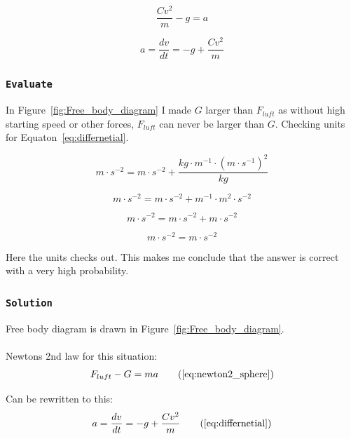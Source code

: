 \documentclass{article}
\let\oldsubsubsection\subsubsection
\renewcommand{\subsubsection}[1]{%
  \oldsubsubsection{\texttt{#1}}%
}
\begin{document}
\begin{equation*}
    \frac{Cv^2}{m} - g = a
\end{equation*}

\begin{equation}
    a = \frac{dv}{dt} = - g + \frac{Cv^2}{m}
    \label{eq:differnetial}
\end{equation}


\clearpage
\subsubsection{Evaluate}
In Figure~\ref{fig:Free_body_diagram} I made \(G\) larger than \(F_{luft}\) as without high starting speed or other forces, \(F_{luft}\) can never be larger than \(G\). Checking units for Equaton~\ref{eq:differnetial}.

\begin{equation*}
    m \cdot s^{-2} = m \cdot s^{-2} + \frac{kg \cdot m^{-1} \cdot (m \cdot s^{-1})^2}{kg}
\end{equation*}

\begin{equation*}
    m \cdot s^{-2} = m \cdot s^{-2} + m^{-1} \cdot m^2 \cdot s^{-2}
\end{equation*}

\begin{equation*}
    m \cdot s^{-2} = m \cdot s^{-2} + m \cdot s^{-2}
\end{equation*}


\begin{equation*}
    m \cdot s^{-2} = m \cdot s^{-2} 
\end{equation*}

Here the units checks out. This makes me conclude that the answer is correct with a very high probability.

\subsubsection{Solution}
Free body diagram is drawn in Figure~\ref{fig:Free_body_diagram}.\\
\\
Newtons 2nd law for this situation:
\begin{equation*}
    F_{luft} - G = ma
    \tag{\ref{eq:newton2_sphere}}
\end{equation*}

Can be rewritten to this:
\begin{equation*}
    a = \frac{dv}{dt} = - g + \frac{Cv^2}{m}
    \tag{\ref{eq:differnetial}}
\end{equation*}
\end{document}
